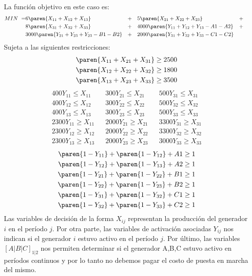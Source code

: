

\begin{homeworkProblem}
La función objetivo en este caso es:
\begin{align*}
    MIN\ = &6\paren{X_{11} + X_{12} + X_{13}}& &+&
     &5\paren{X_{21} + X_{22} + X_{23}}& &+& \\
      &8\paren{X_{31} + X_{32} + X_{33}}& &+&
	&4000\paren{Y_{11} + Y_{12} + Y_{13} - A1 - A2}& &+& \\
    &3000\paren{Y_{21} + Y_{23} + Y_{23} - B1 - B2}& &+&
     &2000\paren{Y_{31} + Y_{32} + Y_{33} - C1 - C2}&
\end{align*}
Sujeta a las siguientes restricciones:
\begin{align*}
    \paren{X_{11} + X_{21} + X_{31}} \geq 2500\\
    \paren{X_{12} + X_{22} + X_{32}} \geq 1800\\
    \paren{X_{13} + X_{23} + X_{33}} \geq 3500
\end{align*}
\begin{align*}
    &400Y_{11} \le X_{11}& &300Y_{21} \le X_{21}& &500Y_{31} \le X_{31}& \\
    &400Y_{12} \le X_{12}& &300Y_{22} \le X_{22}& &500Y_{32} \le X_{32}& \\
    &400Y_{13} \le X_{13}& &300Y_{23} \le X_{23}& &500Y_{33} \le X_{33}& \\
    &2300Y_{11} \geq X_{11}& &2000Y_{21} \geq X_{21}& &3300Y_{31} \geq X_{31}& \\
    &2300Y_{12} \geq X_{12}& &2000Y_{22} \geq X_{22}& &3300Y_{32} \geq X_{32}& \\
    &2300Y_{13} \geq X_{13}& &2000Y_{23} \geq X_{23}& &3000Y_{33} \geq X_{33}& 
\end{align*}
\begin{align*}
    \paren{1-Y_{11}} + \paren{1-Y_{12}} + A1\geq 1\\
    \paren{1-Y_{12}} + \paren{1-Y_{13}} + A2\geq 1\\
    \paren{1-Y_{21}} + \paren{1-Y_{22}} + B1\geq 1\\
    \paren{1-Y_{22}} + \paren{1-Y_{23}} + B2\geq 1\\
    \paren{1-Y_{31}} + \paren{1-Y_{32}} + C1\geq 1\\
    \paren{1-Y_{32}} + \paren{1-Y_{33}} + C2\geq 1
\end{align*}
Las variables de decisión de la forma $X_{ij}$ representan la producción del generador $i$ en el período $j$. Por otra parte, las variables de activación asociadas $Y_{ij}$ nos indican si el generador $i$ estuvo activo en el período $j$.
Por último, las variables $[A|B|C]_{1|2}$ nos permiten determinar si el generador A,B,C estuvo activo en períodos continuos y por lo tanto no debemos pagar el costo de puesta en marcha del mismo.
\end{homeworkProblem}


